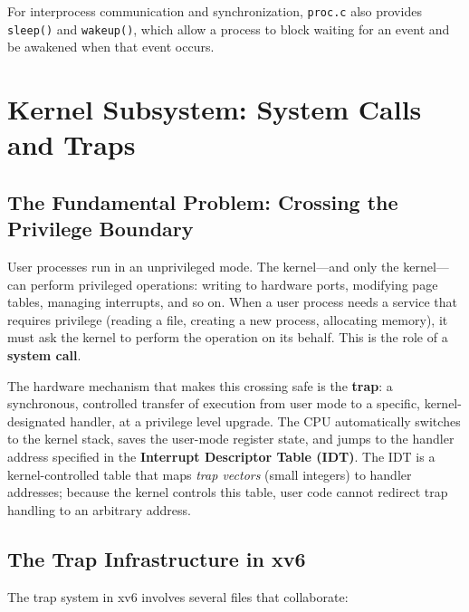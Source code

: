 \documentclass[11pt]{article}
\begin{document}
For interprocess communication and synchronization, \texttt{proc.c} also provides \texttt{sleep()} and \texttt{wakeup()}, which allow a process to block waiting for an event and be awakened when that event occurs.

\section{Kernel Subsystem: System Calls and Traps}

\subsection{The Fundamental Problem: Crossing the Privilege Boundary}

User processes run in an unprivileged mode. The kernel---and only the kernel---can perform privileged operations: writing to hardware ports, modifying page tables, managing interrupts, and so on. When a user process needs a service that requires privilege (reading a file, creating a new process, allocating memory), it must ask the kernel to perform the operation on its behalf. This is the role of a \textbf{system call}.

The hardware mechanism that makes this crossing safe is the \textbf{trap}: a synchronous, controlled transfer of execution from user mode to a specific, kernel-designated handler, at a privilege level upgrade. The CPU automatically switches to the kernel stack, saves the user-mode register state, and jumps to the handler address specified in the \textbf{Interrupt Descriptor Table (IDT)}. The IDT is a kernel-controlled table that maps \emph{trap vectors} (small integers) to handler addresses; because the kernel controls this table, user code cannot redirect trap handling to an arbitrary address.

\subsection{The Trap Infrastructure in xv6}

The trap system in xv6 involves several files that collaborate:
\end{document}

